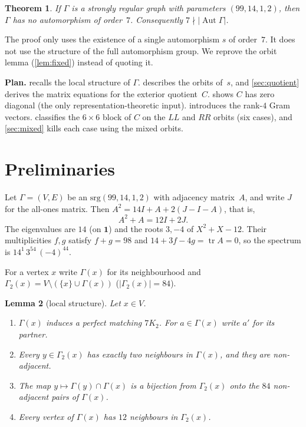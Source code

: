 \documentclass[11pt,a4paper]{amsart}
\newtheorem{theorem}{Theorem}[section]
\newtheorem{lemma}[theorem]{Lemma}
\theoremstyle{definition}
\theoremstyle{remark}
\newcommand{\one}{\mathbf{1}}
\newcommand{\tr}{\operatorname{tr}}
\DeclareMathOperator{\Aut}{Aut}
\begin{document}
\begin{theorem}\label{thm:main}
If $\Gamma$ is a strongly regular graph with parameters $(99,14,1,2)$, then $\Gamma$ has no automorphism of
order~$7$. Consequently $7\nmid|\Aut\Gamma|$.
\end{theorem}

The proof only uses the existence of a single automorphism $s$ of order~$7$. It does not use the structure
of the full automorphism group. We reprove the orbit lemma (\cref{lem:fixed}) instead of quoting it.

\medskip\noindent\textbf{Plan.}
 recalls the local structure of $\Gamma$.  describes the orbits of~$s$,
and \cref{sec:quotient} derives the matrix equations for the exterior quotient~$C$. 
shows $C$ has zero diagonal (the only representation-theoretic input).  introduces the
rank-$4$ Gram vectors.  classifies the $6\times6$ block of $C$ on the $LL$ and $RR$ orbits
(six cases), and \cref{sec:mixed} kills each case using the mixed orbits.

\section{Preliminaries}\label{sec:prelim}

Let $\Gamma=(V,E)$ be an $\mathrm{srg}(99,14,1,2)$ with adjacency matrix~$A$, and write $J$ for the all-ones
matrix. Then $A^2=14I+A+2(J-I-A)$, that is,
\begin{equation}\label{eq:srg}
A^2+A=12I+2J .
\end{equation}
The eigenvalues are $14$ (on $\one$) and the roots $3,-4$ of $X^2+X-12$. Their multiplicities $f,g$
satisfy $f+g=98$ and $14+3f-4g=\tr A=0$, so the spectrum is $14^1\,3^{54}\,(-4)^{44}$.

For a vertex $x$ write $\Gamma(x)$ for its neighbourhood and $\Gamma_2(x)=V\setminus(\{x\}\cup\Gamma(x))$
($|\Gamma_2(x)|=84$).

\begin{lemma}[local structure]\label{lem:local}
Let $x\in V$.
\begin{enumerate}[label=(\alph*)]
\item $\Gamma(x)$ induces a perfect matching $7K_2$. For $a\in\Gamma(x)$ write $a'$ for its partner.
\item Every $y\in\Gamma_2(x)$ has exactly two neighbours in $\Gamma(x)$, and they are non-adjacent.
\item The map $y\mapsto\Gamma(y)\cap\Gamma(x)$ is a bijection from $\Gamma_2(x)$ onto the $84$
non-adjacent pairs of $\Gamma(x)$.
\item Every vertex of $\Gamma(x)$ has $12$ neighbours in $\Gamma_2(x)$.
\end{enumerate}
\end{lemma}
\end{document}

